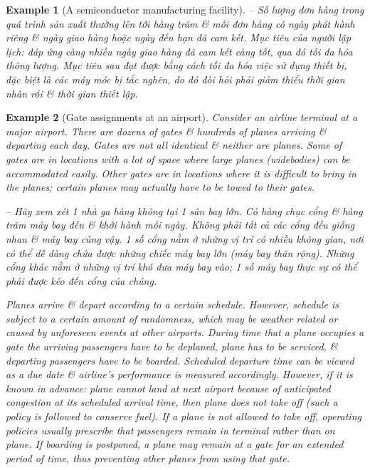 \documentclass{article}
\newtheorem{example}{Example}
\begin{document}
\begin{itemize}
\begin{itemize}
\begin{example}[A semiconductor manufacturing facility]
            -- Số lượng đơn hàng trong quá trình sản xuất thường lên tới hàng trăm \& mỗi đơn hàng có ngày phát hành riêng \& ngày giao hàng hoặc ngày đến hạn đã cam kết. Mục tiêu của người lập lịch: đáp ứng càng nhiều ngày giao hàng đã cam kết càng tốt, qua đó tối đa hóa thông lượng. Mục tiêu sau đạt được bằng cách tối đa hóa việc sử dụng thiết bị, đặc biệt là các máy móc bị tắc nghẽn, do đó đòi hỏi phải giảm thiểu thời gian nhàn rỗi \& thời gian thiết lập.
        \end{example}

        \begin{example}[Gate assignments at an airport]
            Consider an airline terminal at a major airport. There are dozens of gates \& hundreds of planes arriving \& departing each day. Gates are not all identical \& neither are planes. Some of gates are in locations with a lot of space where large planes (widebodies) can be accommodated easily. Other gates are in locations where it is difficult to bring in the planes; certain planes may actually have to be towed to their gates.

            -- Hãy xem xét 1 nhà ga hàng không tại 1 sân bay lớn. Có hàng chục cổng \& hàng trăm máy bay đến \& khởi hành mỗi ngày. Không phải tất cả các cổng đều giống nhau \& máy bay cũng vậy. 1 số cổng nằm ở những vị trí có nhiều không gian, nơi có thể dễ dàng chứa được những chiếc máy bay lớn (máy bay thân rộng). Những cổng khác nằm ở những vị trí khó đưa máy bay vào; 1 số máy bay thực sự có thể phải được kéo đến cổng của chúng.

            Planes arrive \& depart according to a certain schedule. However, schedule is subject to a certain amount of randomness, which may be weather related or caused by unforeseen events at other airports. During time that a plane occupies a gate the arriving passengers have to be deplaned, plane has to be serviced, \& departing passengers have to be boarded. Scheduled departure time can be viewed as a due date \& airline's performance is measured accordingly. However, if it is known in advance: plane cannot land at next airport because of anticipated congestion at its scheduled arrival time, then plane does not take off (such a policy is followed to conserve fuel). If a plane is not allowed to take off, operating policies usually prescribe that passengers remain in terminal rather than on plane. If boarding is postponed, a plane may remain at a gate for an extended period of time, thus preventing other planes from using that gate.


\end{example}
\end{itemize}
\end{itemize}
\end{document}
